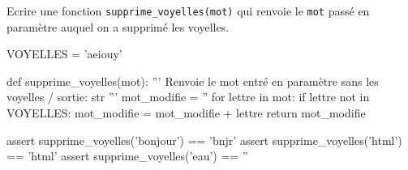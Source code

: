 \documentclass[a4paper,10pt]{report}
\def\ptsexoF{2}
\begin{document}
    \medskip

    \exods{\ptsexoF}


Ecrire une fonction \verb|supprime_voyelles(mot)| qui renvoie le \verb|mot| passé en paramètre auquel on a supprimé les voyelles.

\begin{CodePythontexAlt}[TaillePolice=\large,Largeur=1\linewidth,Centre,PremLigne=1]{}

VOYELLES = 'aeiouy'

def supprime_voyelles(mot):
    ''' Renvoie le mot entré en paramètre sans les voyelles / sortie: str '''
    mot_modifie = ''
    for lettre in mot:
        if lettre not in VOYELLES:
            mot_modifie = mot_modifie + lettre
    return mot_modifie

assert supprime_voyelles('bonjour') == 'bnjr'
assert supprime_voyelles('html') == 'html'
assert supprime_voyelles('eau') == ''
    \end{CodePythontexAlt}
\end{document}
